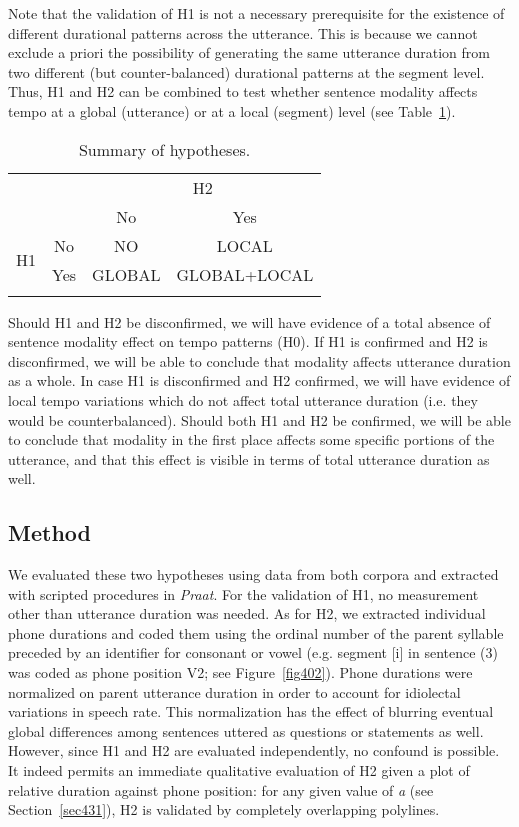 Note that the validation of H1 is not a necessary prerequisite for the existence of different durational patterns across the utterance. This is because we cannot exclude a priori the possibility of generating the same utterance duration from two different (but counter-balanced) durational patterns at the segment level. Thus, H1 and H2 can be combined to test whether sentence modality affects tempo at a global (utterance) or at a local (segment) level (see Table~\ref{tab42}).

\begin{table}[h]
\centering
\begin{tabular}{c c  c c}
\mytoprule
 & & \multicolumn{2}{c}{H2}\\
&  & No & Yes\\
\midrule
\multirow{2}{*}{H1} & No & NO & LOCAL\\
 & Yes & GLOBAL & GLOBAL+LOCAL\\
 \mybottomrule
\end{tabular}
\caption{Summary of hypotheses.}
\label{tab42}\end{table}

Should H1 and H2 be disconfirmed, we will have evidence of a total absence of sentence modality effect on tempo patterns (H0). If H1 is confirmed and H2 is disconfirmed, we will be able to conclude that modality affects utterance duration as a whole. In case H1 is disconfirmed and H2 confirmed, we will have evidence of local tempo variations which do not affect total utterance duration (i.e. they would be counterbalanced). Should both H1 and H2 be confirmed, we will be able to conclude that modality in the first place affects some specific portions of the utterance, and that this effect is visible in terms of total utterance duration as well. 

\subsection{Method}\label{sec432}
We evaluated these two hypotheses using data from both corpora and extracted with scripted procedures in \textit{Praat}. For the validation of H1, no measurement other than utterance duration was needed. As for H2, we extracted individual phone durations and coded them using the ordinal number of the parent syllable preceded by an identifier for consonant or vowel (e.g. segment [i] in sentence (3) was coded as phone position V2; see  Figure~\ref{fig402}). Phone durations were normalized on parent utterance duration in order to account for idiolectal variations in speech rate. This normalization has the effect of blurring eventual global differences among sentences uttered as questions or statements as well. However, since H1 and H2 are evaluated independently, no confound is possible. It indeed permits an immediate qualitative evaluation of H2 given a plot of relative duration against phone position: for any given value of \textit{a} (see Section~\ref{sec431}), H2 is validated by completely overlapping polylines. 

